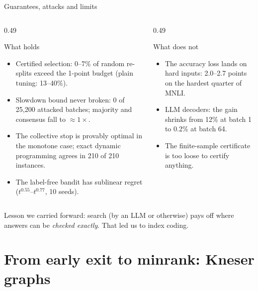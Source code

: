 \documentclass[11pt]{beamer}
\begin{document}
\begin{frame}{Guarantees, attacks and limits}
  \begin{columns}[T]
    \begin{column}{0.49\textwidth}
      \begin{block}{What holds}
        \footnotesize
        \begin{itemize}
          \item Certified selection: 0--7\% of random re-splits exceed the 1-point budget (plain tuning: 13--40\%).
          \item Slowdown bound never broken: 0 of 25{,}200 attacked batches; majority and consensus fall to $\approx 1\times$.
          \item The collective stop is provably optimal in the monotone case; exact dynamic programming agrees in
                210 of 210 instances.
          \item The label-free bandit has sublinear regret ($t^{0.55}$--$t^{0.77}$, 10 seeds).
        \end{itemize}
      \end{block}
    \end{column}
    \begin{column}{0.49\textwidth}
      \begin{alertblock}{What does not}
        \footnotesize
        \begin{itemize}
          \item The accuracy loss lands on hard inputs: 2.0--2.7 points on the hardest quarter of MNLI.
          \item LLM decoders: the gain shrinks from 12\% at batch 1 to 0.2\% at batch 64.
          \item The finite-sample certificate is too loose to certify anything.
        \end{itemize}
      \end{alertblock}
    \end{column}
  \end{columns}
  \vfill
  \small Lesson we carried forward: search (by an LLM or otherwise) pays off where answers can be
  \emph{checked exactly}. That led us to index coding.
\end{frame}

\section{From early exit to minrank: Kneser graphs}
\end{document}
